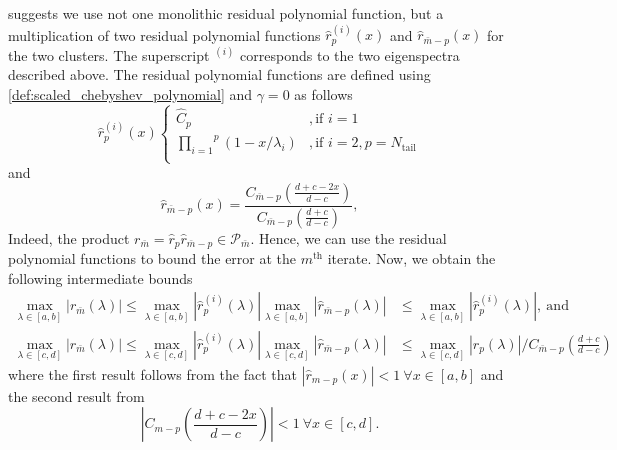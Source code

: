 \citeauthor{cg_sharpened_convrate_Axelsson1976} suggests we use not one monolithic residual polynomial function, but a multiplication of two residual polynomial functions $\hat{r}^{(i)}_p(x)$ and $\hat{r}_{\bar{m}-p}(x)$ for the two clusters. The superscript $^{(i)}$ corresponds to the two eigenspectra described above. The residual polynomial functions are defined using \cref{def:scaled_chebyshev_polynomial} and $\gamma = 0$ as follows
\begin{equation}
    \hat{r}^{(i)}_p (x)
    \begin{cases}
        \hat{C}_p&, \text{if } i = 1\\
        \overset{p}{\underset{i=1}{\prod}} (1 - x/\lambda_i)&, \text{if } i = 2, p = N_{\text{tail}}\\
    \end{cases}
    \label{eq:residual_polynomial_rm}
\end{equation}
and
\begin{equation}
    \hat{r}_{{\bar{m}}-p} (x) = \frac{C_{\bar{m}-p} \left(\frac{d + c - 2x}{d - c}\right)}{C_{\bar{m}-p}\left(\frac{d + c}{d - c}\right)},
    \label{eq:residual_polynomial_rpm}
\end{equation}
Indeed, the product $r_{\bar{m}} = \hat{r}_p \hat{r}_{\bar{m}-p} \in \mathcal{P}_{\bar{m}}$. Hence, we can use the residual polynomial functions to bound the error at the $m^{\text{th}}$ iterate. Now, we obtain the following intermediate bounds
\begin{subequations}
    \begin{align}
        \max_{\lambda \in [a,b]} |r_{\bar{m}}(\lambda)| \leq \max_{\lambda \in [a,b]} |\hat{r}^{(i)}_p(\lambda)| \max_{\lambda \in [a,b]} |\hat{r}_{\bar{m}-p}(\lambda)| &\leq \max_{\lambda \in [a,b]} |\hat{r}^{(i)}_p(\lambda)|, \ \text{and} \label{eq:residual_polynomial_bound_ab}\\
        \max_{\lambda \in [c,d]} |r_{\bar{m}}(\lambda)| \leq \max_{\lambda \in [c,d]} |\hat{r}^{(i)}_p(\lambda)| \max_{\lambda \in [c,d]} |\hat{r}_{\bar{m}-p}(\lambda)| &\leq \max_{\lambda \in [c,d]} |\hat{r}_{p}(\lambda)|/C_{\bar{m}-p}\left(\frac{d+c}{d-c}\right) \label{eq:residual_polynomial_bound_cd}
    \end{align}
\end{subequations}
where the first result follows from the fact that $|\hat{r}_{m-p}(x)| < 1 \ \forall x \in [a,b]$ and the second result from 
\[
    \left|C_{m-p}\left(\frac{d+c -2x}{d-c}\right)\right| < 1 \ \forall x \in [c,d].
\]

